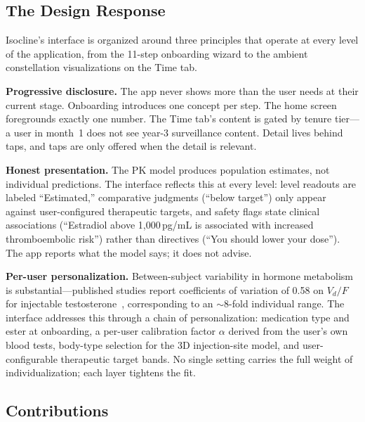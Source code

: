 \documentclass[11pt,a4paper]{article}
\begin{document}
\subsection{The Design Response}
\label{sec:design_response}

Isocline's interface is organized around three principles that operate at every
level of the application, from the 11-step onboarding wizard to the
ambient constellation visualizations on the Time tab.

\textbf{Progressive disclosure.} The app never shows more than the user
needs at their current stage. Onboarding introduces one concept per step.
The home screen foregrounds exactly one number. The Time tab's content is
gated by tenure tier---a user in month~1 does not see year-3 surveillance
content. Detail lives behind taps, and taps are only offered when the
detail is relevant.

\textbf{Honest presentation.} The PK model produces population estimates,
not individual predictions. The interface reflects this at every level:
level readouts are labeled ``Estimated,'' comparative judgments (``below
target'') only appear against user-configured therapeutic targets, and
safety flags state clinical associations (``Estradiol above
1,000\,pg/mL is associated with increased thromboembolic risk'') rather
than directives (``You should lower your dose''). The app reports what
the model says; it does not advise.

\textbf{Per-user personalization.} Between-subject variability in hormone
metabolism is substantial---published studies report coefficients of
variation of 0.58 on $V_d/F$ for injectable testosterone~\cite{ichihara2020},
corresponding to an $\sim$8-fold individual range. The interface
addresses this through a chain of personalization: medication type and
ester at onboarding, a per-user calibration factor $\alpha$ derived from
the user's own blood tests, body-type selection for the 3D injection-site
model, and user-configurable therapeutic target bands. No single setting
carries the full weight of individualization; each layer tightens the
fit.

\subsection{Contributions}
\label{sec:contributions}
\end{document}
